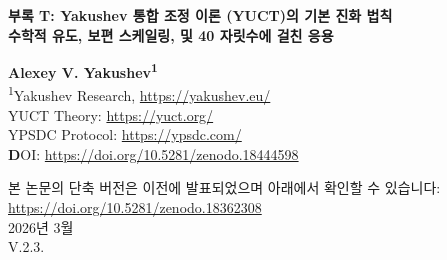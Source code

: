 \documentclass[12pt,a4paper]{article}
\theoremstyle{remark}
\begin{document}
	
	\begin{titlepage}
		\begin{center}
			\vspace*{1cm}
			
			\Huge\textbf{부록 T: Yakushev 통합 조정 이론 (YUCT)의 기본 진화 법칙} \\
			\vspace{0.5cm}
			\Large\textbf{수학적 유도, 보편 스케일링, 및 40 자릿수에 걸친 응용}
			
			\vspace{1.5cm}
			
			\Large\textbf{Alexey V. Yakushev\textsuperscript{1}} \\
			
			
			\vspace{0.3cm}
			\large
			\textsuperscript{1}Yakushev Research, \url{https://yakushev.eu/} \\
			
			\vspace{1cm}
			\large
			YUCT Theory: \url{https://yuct.org/}\\
			YPSDC Protocol: \url{https://ypsdc.com/}\\
			
			\vspace{2cm}
			\textbf DOI: \url{https://doi.org/10.5281/zenodo.18444598}\\
			
			\vspace{1cm}
			
			\vspace{0cm}
			\large 
			본 논문의 단축 버전은 이전에 발표되었으며 아래에서 확인할 수 있습니다:\\ \url{https://doi.org/10.5281/zenodo.18362308}\\
			\vspace{1cm}
			2026년 3월 \\ \large V.2.3.
			
			\vspace{2cm}
			

\end{center}
\end{titlepage}
\end{document}
